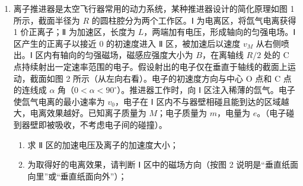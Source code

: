 \documentclass[\gkver]{gaokaozhenti}
\begin{document}
\begin{enumerate}
\begin{enumerate}
	\item
	求此下落过程中铝块机械能的损失。
\end{enumerate}



\item
离子推进器是太空飞行器常用的动力系统，某种推进器设计的简化原理如图 1 所示，截面半径为 $R$ 的圆柱腔分为两个工作区。Ⅰ 为电离区，将氙气电离获得 1 价正离子；Ⅱ 为加速区，长度为 $L$，两端加有电压，形成轴向的匀强电场。Ⅰ 区产生的正离子以接近 0 的初速度进入 Ⅱ 区，被加速后以速度 $v_{M}$ 从右侧喷出。Ⅰ 区内有轴向的匀强磁场，磁感应强度大小为 $B$，在离轴线 $R/2$ 处的 C 点持续射出一定速率范围的电子。假设射出的电子仅在垂直于轴线的截面上运动，截面如图 2 所示（从左向右看）。电子的初速度方向与中心 O 点和 C 点的连线成 $\alpha$ 角（$0<\alpha<90^{\circ}$）。推进器工作时，向 Ⅰ 区注入稀薄的氙气。电子使氙气电离的最小速率为 $v_{0}$，电子在 Ⅰ 区内不与器壁相碰且能到达的区域越大，电离效果越好。已知离子质量为 $M$；电子质量为 $m$，电量为 $e$。（电子碰到器壁即被吸收，不考虑电子间的碰撞）。

\begin{enumerate}
	\item
	求 Ⅱ 区的加速电压及离子的加速度大小；

	\item
	为取得好的电离效果，请判断 Ⅰ 区中的磁场方向（按图 2 说明是“垂直纸面向里”或“垂直纸面向外”）；


\end{enumerate}
\end{enumerate}
\end{document}
